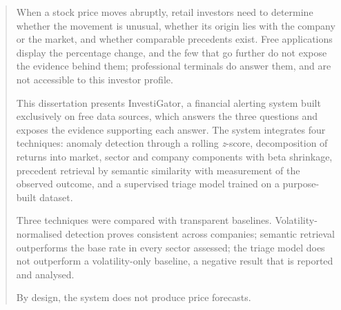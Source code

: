 
\begin{abstract}
When a stock price moves abruptly, retail investors need to determine whether the movement is
unusual, whether its origin lies with the company or the market, and whether comparable precedents
exist. Free applications display the percentage change, and the few that go further do not
expose the evidence behind them;
professional terminals do answer them, and are not accessible to this investor profile.

This dissertation presents InvestiGator, a financial alerting system built exclusively on free data
sources, which answers the three questions and exposes the evidence supporting each answer. The
system integrates four techniques: anomaly detection through a rolling \emph{z}-score, decomposition
of returns into market, sector and company components with beta shrinkage, precedent retrieval by
semantic similarity with measurement of the observed outcome, and a supervised triage model trained
on a purpose-built dataset.

Three techniques were compared with transparent baselines. Volatility-normalised detection proves
consistent across companies; semantic retrieval outperforms the base rate in every sector assessed;
the triage model does not outperform a volatility-only baseline, a negative result that is reported
and analysed.

By design, the system does not produce price forecasts.
\end{abstract}

